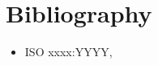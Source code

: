 
\chapter{Bibliography}

\begin{itemize}
	\renewcommand{\labelitemi}{---}

	\item
	ISO xxxx:YYYY,


\end{itemize}
